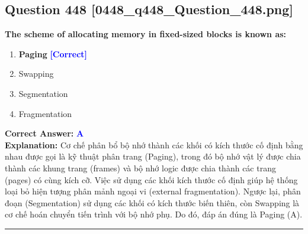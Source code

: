 \documentclass[11pt,a4paper]{article}
\begin{document}
\begin{minipage}{\textwidth}
\subsection*{Question 448 \quad \footnotesize{[0448\_q448\_Question\_448.png]}}
\noindent \textbf{The scheme of allocating memory in fixed-sized blocks is known as:}

\begin{enumerate}[label=\Alph*.]
    \item \textbf{Paging} \hfill \textcolor{blue}{\textbf{[Correct]}}
    \item Swapping
    \item Segmentation
    \item Fragmentation
\end{enumerate}

\noindent \textbf{Correct Answer:} \textcolor{blue}{\textbf{A}} \\[2pt]
\noindent \textbf{Explanation:} Cơ chế phân bổ bộ nhớ thành các khối có kích thước cố định bằng nhau được gọi là kỹ thuật phân trang (Paging), trong đó bộ nhớ vật lý được chia thành các khung trang (frames) và bộ nhớ logic được chia thành các trang (pages) có cùng kích cỡ. Việc sử dụng các khối kích thước cố định giúp hệ thống loại bỏ hiện tượng phân mảnh ngoại vi (external fragmentation). Ngược lại, phân đoạn (Segmentation) sử dụng các khối có kích thước biến thiên, còn Swapping là cơ chế hoán chuyển tiến trình với bộ nhớ phụ. Do đó, đáp án đúng là Paging (A).

\par\vspace{0.3cm}
\hrule
\vspace{0.3cm}
\end{minipage}
\end{document}
